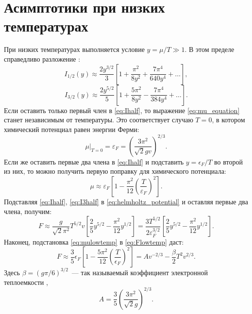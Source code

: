 \section{Асимптотики при низких температурах}
\label{sec:asymp_low}
При низких температурах выполняется условие $y = \mu / T \gg 1$.
В этом пределе справедливо разложение \cite{Shemyakin:JPA:2010}:
\begin{equation}
    \label{eq:Ihalf}
    I_{1/2}(y) \approx
    \frac{2y^{3/2}}{3}\left[1+\frac{\pi^2}{8y^2}+\frac{7\pi^4}{640y^4} + \ldots\right],
\end{equation}
\begin{equation}
    \label{eq:I3half}
    I_{3/2}(y) \approx \frac{2y^{5/2}}{5}\left[1+\frac{5\pi^2}{8y^2}-\frac{7\pi^4}{384y^4} + \ldots\right].
\end{equation}
Если оставить только первый член в \eqref{eq:Ihalf}, то выражение \eqref{eq:mu_equation} станет независимым от температуры.
Это соответствует случаю $T=0$, в котором химический потенциал равен энергии Ферми:
\begin{equation}
    \mu|_{T = 0} = \varepsilon_F = \left( \frac{3\pi^2}{\sqrt{2}gv} \right)^{2/3}.
\end{equation}
Если же оставить первые два члена в \eqref{eq:Ihalf} и подставить $y = \epsilon_F / T$ во второй из них, то можно получить первую поправку для химического потенциала:
\begin{equation}
    \mu \approx \varepsilon_F\left[
    1 - \frac{\pi^2}{12}\left( \frac{T}{\varepsilon_F} \right)^2 \right].
    \label{eq:mulowtemp}
\end{equation}
Подставляя \eqref{eq:Ihalf}, \eqref{eq:I3half} в \eqref{eq:helmholtz_potential} и оставляя первые два члена, получим:
\begin{equation}
    F \approx \frac{g}{\sqrt{2}\pi^2}T^{5/2}v\left[ \frac{2}{5}y^{5/2} - \frac{\pi^2}{12}y^{1/2} \right]
    = \frac{3T^{5/2}}{2\varepsilon_F^{3/2}}\left[ \frac{2}{5}y^{5/2} - \frac{\pi^2}{12}y^{1/2} \right].
    \label{eq:Flowtemp}
\end{equation}
Наконец, подстановка \eqref{eq:mulowtemp} в \eqref{eq:Flowtemp} даст:
\begin{equation}
    \label{eq:F_lt}
    F \approx \frac{3}{5}\epsilon_F\left[ 1 - \frac{5\pi^2}{12}\left( \frac{T}{\epsilon_F} \right)^2 \right]
    = Av^{-2/3} - \frac{\beta}{2}T^2 v^{2/3}.
\end{equation}
Здесь $\beta = (g \pi / 6)^{3 / 2}$~--- так называемый коэффициент электронной теплоемкости \cite{Landau:statmech:1958},
\begin{equation}
    \label{eq:A_def}
    A = \frac{3}{5}\left( \frac{3\pi^2}{\sqrt{2}g} \right)^{2/3}.
\end{equation}

